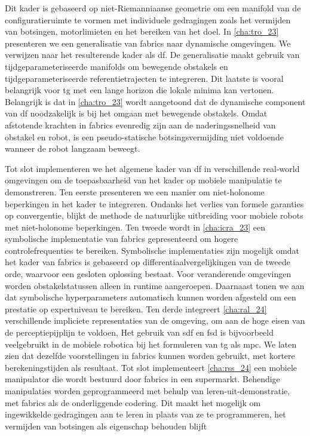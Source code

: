 Dit kader is gebaseerd op niet-Riemanniaanse geometrie om een manifold
van de configuratieruimte te vormen met individuele gedragingen zoals
het vermijden van botsingen, motorlimieten en het bereiken van het doel.
In \cref{cha:tro_23}
presenteren we een generalisatie van \ac{fabrics} naar dynamische omgevingen. We
verwijzen naar het resulterende kader als \ac{df}. De generalisatie maakt
gebruik van tijdgeparameteriseerde manifolds
om bewegende obstakels en
tijdgeparameteriseerde referentietrajecten te integreren. Dit laatste is vooral
belangrijk voor \ac{tg} met een lange horizon die lokale minima kan vertonen.
Belangrijk is dat in \cref{cha:tro_23} wordt aangetoond dat de dynamische
component van \ac{df} noodzakelijk is bij het omgaan met bewegende obstakels.
Omdat afstotende krachten in \ac{fabrics} evenredig zijn aan de
naderingssnelheid van obstakel en robot, is een pseudo-statische
botsingsvermijding niet voldoende wanneer de robot langzaam beweegt.

Tot slot implementeren we het algemene kader van \ac{df} in verschillende
real-world omgevingen om de toepasbaarheid van het kader op mobiele manipulatie
te demonstreren. Ten eerste presenteren we een manier om niet-holonome
beperkingen in het kader te integreren. Ondanks het verlies van formele
garanties op convergentie, blijkt de methode de natuurlijke uitbreiding voor
mobiele robots met niet-holonome beperkingen. Ten tweede wordt in
\cref{cha:icra_23} een symbolische implementatie van \ac{fabrics} gepresenteerd
om hogere controlefrequenties te bereiken. Symbolische implementaties zijn
mogelijk omdat het kader van \ac{fabrics} is gebaseerd op
differentiaalvergelijkingen van de tweede orde, waarvoor een gesloten oplossing
bestaat. Voor veranderende omgevingen worden obstakelstatussen alleen in runtime
aangeroepen. Daarnaast tonen we aan dat symbolische hyperparameters
automatisch kunnen worden afgesteld om een prestatie op expertniveau te
bereiken. Ten derde integreert \cref{cha:ral_24} verschillende impliciete representaties van de omgeving, om aan de hoge eisen van de
perceptiepijplijn te voldoen,
Het gebruik van \ac{sdf} en \ac{fsd} is bijvoorbeeld
veelgebruikt in de mobiele robotica bij het formuleren van \ac{tg} als \ac{mpc}.
We laten zien dat dezelfde voorstellingen in \ac{fabrics} kunnen worden
gebruikt, met kortere berekeningstijden als resultaat. Tot slot implementeert
\cref{cha:rss_24} een mobiele manipulator die wordt bestuurd door \ac{fabrics}
in een supermarkt. Behendige manipulaties worden geprogrammeerd met behulp van
leren-uit-demonstratie, met \ac{fabrics} als de onderliggende codering. Dit
maakt het mogelijk om ingewikkelde gedragingen aan te leren in plaats van ze te
programmeren, het vermijden van botsingen als eigenschap behouden blijft 

